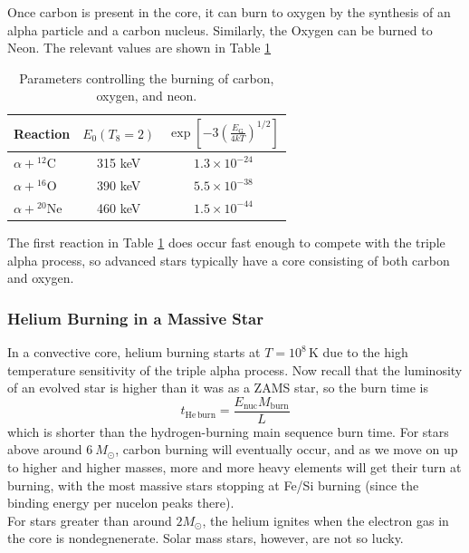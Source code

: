 \documentclass[10pt]{article}
\numberwithin{equation}{section}
\newcommand{\n}{\noindent}
\begin{document}
    Once carbon is present in the core, it can burn to oxygen by the
    synthesis of an alpha particle and a carbon nucleus. Similarly,
    the Oxygen can be burned to Neon. The relevant values are shown in
    Table \ref{tab:1}
    \begin{table}[h!]
      \centering
      \begin{tabular}{l c c}
        Reaction & $E_0(T_8=2)$ &
        $\exp\left[-3\left(\frac{E_\mathrm{G}}{4kT}\right)^{1/2}\right]$\\
        \hline\hline
        $\alpha+{}^{12}\mathrm{C}$ & 315 keV & $1.3\times 10^{-24}$\\
        $\alpha+{}^{16}\mathrm{O}$ & 390 keV & $5.5\times 10^{-38}$\\
        $\alpha+{}^{20}\mathrm{Ne}$& 460 keV & $1.5\times 10^{-44}$
      \end{tabular}
      \caption{Parameters controlling the burning of carbon, oxygen, and 
neon.}
      \label{tab:1}
    \end{table}
    The first reaction in Table \ref{tab:1} does occur fast enough to
    compete with the triple alpha process, so advanced stars typically
    have a core consisting of both carbon and oxygen.

    \subsubsection{Helium Burning in a Massive Star}
    \label{sec:heli-burn-mass}
    In a convective core, helium burning starts at
    $T=10^8\,\mathrm{K}$ due to the high temperature sensitivity of
    the triple alpha process. Now recall that the luminosity of an
    evolved star is higher than it was as a ZAMS star, so the burn
    time is
    \begin{equation}
      \label{eq:276}
      t_{\mathrm{He\,burn}}=\frac{E_{\mathrm{nuc}}M_{\mathrm{burn}}}{L}
    \end{equation}
    which is shorter than the hydrogen-burning main sequence burn
    time. For stars above around $6\ M_\odot$, carbon burning will
    eventually occur, and as we move on up to higher and higher
    masses, more and more heavy elements will get their turn at
    burning, with the most massive stars stopping at Fe/Si burning
    (since the binding energy per nucelon peaks there).\\

    \n For stars greater than around $2 M_\odot$, the helium ignites
    when the electron gas in the core is nondegnenerate. Solar mass
    stars, however, are not so lucky.
\end{document}
